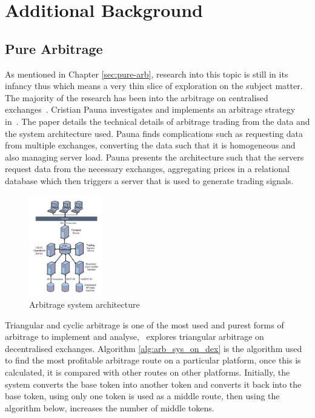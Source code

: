 \appendix
\chapter{Additional Background}
\section{Pure Arbitrage}
\label{appendix:add-background-pure-arb}
As mentioned in Chapter \ref{sec:pure-arb}, research into this topic is still in its infancy thus which means a very thin slice of exploration on the subject matter. The majority of the research has been into the arbitrage on centralised exchanges~\cite{MakarovIgor2020Taai, crepelliere_arbitrage_2022, PAUNACristian2018ATSf}. Cristian Pauna investigates and implements an arbitrage strategy in~\cite{PAUNACristian2018ATSf}. The paper details the technical details of arbitrage trading from the data and the system architecture used. Pauna finds complications such as requesting data from multiple exchanges, converting the data such that it is homogeneous and also managing server load. Pauna presents the architecture such that the servers request data from the necessary exchanges, aggregating prices in a relational database which then triggers a server that is used to generate trading signals.
\\[5mm]
\begin{figure}[!htb]
    \centering
    \includegraphics[width=0.28\textwidth]{background/Images/Arbitrage-Architecture.png}
    \caption{Arbitrage system architecture~\cite{PAUNACristian2018ATSf}}
\end{figure}

\noindent Triangular and cyclic arbitrage is one of the most used and purest forms of arbitrage to implement and analyse,~\cite{boonpeam2021arbitrage} explores triangular arbitrage on decentralised exchanges. Algorithm \ref{alg:arb_sys_on_dex} is the algorithm used to find the most profitable arbitrage route on a particular platform, once this is calculated, it is compared with other routes on other platforms. Initially, the system converts the base token into another token and converts it back into the base token, using only one token is used as a middle route, then using the algorithm below, increases the number of middle tokens.
\\[5mm]

